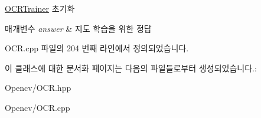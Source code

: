 \hyperlink{class_o_c_r_trainer}{O\+C\+R\+Trainer} 초기화 


\begin{DoxyParams}{매개변수}
{\em answer} & 지도 학습을 위한 정답 \\
\hline
\end{DoxyParams}


O\+C\+R.\+cpp 파일의 204 번째 라인에서 정의되었습니다.



이 클래스에 대한 문서화 페이지는 다음의 파일들로부터 생성되었습니다.\+:\begin{DoxyCompactItemize}
\item 
Opencv/O\+C\+R.\+hpp\item 
Opencv/O\+C\+R.\+cpp\end{DoxyCompactItemize}
